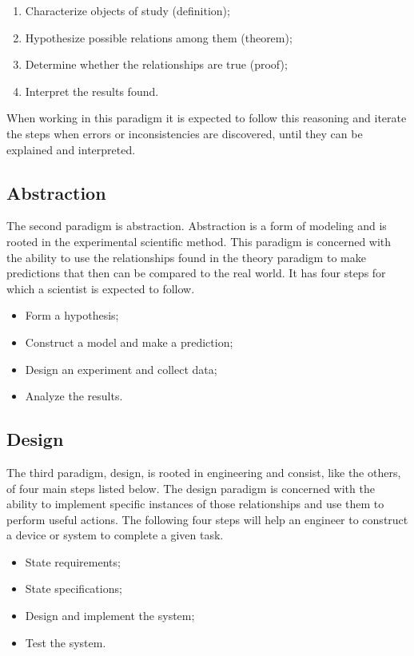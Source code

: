 \documentclass[thesis.tex]{subfiles}
\begin{document}
\begin{enumerate}
\item Characterize objects of study (definition);
\item Hypothesize possible relations among them (theorem);
\item Determine whether the relationships are true (proof);
\item Interpret the results found.
\end{enumerate}

When working in this paradigm it is expected to follow this reasoning and iterate the steps when errors or inconsistencies are discovered, until they can be explained and interpreted.

\subsection{Abstraction} \label{sec:abstraction}
The second paradigm is abstraction. Abstraction is a form of modeling and is rooted in the experimental scientific method. This paradigm is concerned with the ability to use the relationships found in the theory paradigm to make predictions that then can be compared to the real world. It has four steps for which a scientist is expected to follow. 

\begin{itemize}
\item Form a hypothesis;
\item Construct a model and make a prediction;
\item Design an experiment and collect data;
\item Analyze the results.
\end{itemize}

\subsection{Design} \label{sec:design}
The third paradigm, design, is rooted in engineering and consist, like the others, of four main steps listed below. The design paradigm is concerned with the ability to implement specific instances of those relationships and use them to perform useful actions. The following four steps will help an engineer to construct a device or system to complete a given task.

\begin{itemize}
\item State requirements;
\item State specifications;
\item Design and implement the system;
\item Test the system.
\end{itemize}
\end{document}
